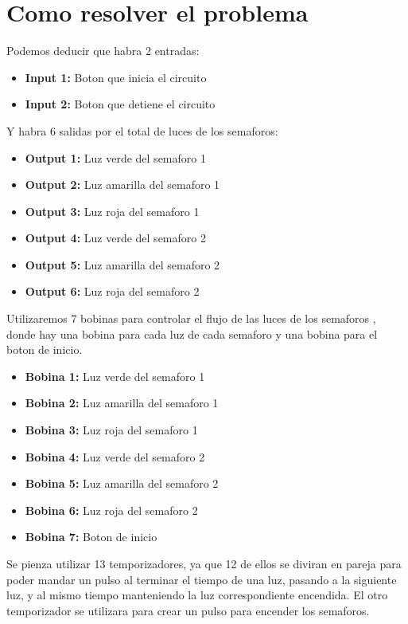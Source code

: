 \documentclass[12pt]{report}
\begin{document}
\section{Como resolver el problema}
  Podemos deducir que habra 2 entradas:
  \begin{itemize}
    \item \textbf{Input 1:} Boton que inicia el circuito
    \item \textbf{Input 2:} Boton que detiene el circuito
  \end{itemize}
  Y habra 6 salidas por el total de luces de los semaforos:
  \begin{itemize}
    \item \textbf{Output 1:} Luz verde del semaforo 1
    \item \textbf{Output 2:} Luz amarilla del semaforo 1
    \item \textbf{Output 3:} Luz roja del semaforo 1
    \item \textbf{Output 4:} Luz verde del semaforo 2
    \item \textbf{Output 5:} Luz amarilla del semaforo 2
    \item \textbf{Output 6:} Luz roja del semaforo 2
  \end{itemize}
  Utilizaremos 7 bobinas para controlar el flujo de las luces de los semaforos , donde hay una bobina para cada luz de cada semaforo y una bobina para el boton de inicio.
  \begin{itemize}
    \item \textbf{Bobina 1:} Luz verde del semaforo 1
    \item \textbf{Bobina 2:} Luz amarilla del semaforo 1
    \item \textbf{Bobina 3:} Luz roja del semaforo 1
    \item \textbf{Bobina 4:} Luz verde del semaforo 2
    \item \textbf{Bobina 5:} Luz amarilla del semaforo 2
    \item \textbf{Bobina 6:} Luz roja del semaforo 2
    \item \textbf{Bobina 7:} Boton de inicio
  \end{itemize}
  Se pienza utilizar 13 temporizadores, ya que 12 de ellos se diviran en pareja para poder mandar un pulso al terminar el tiempo de una luz, pasando a la siguiente luz, y al mismo tiempo manteniendo la luz correspondiente encendida.
  El otro temporizador se utilizara para crear un pulso para encender los semaforos.
\end{document}
